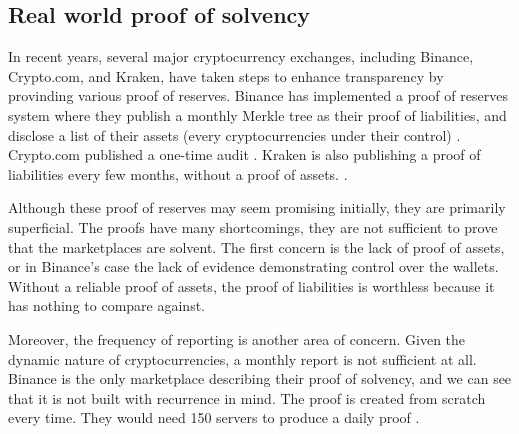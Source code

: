 \subsection{Real world proof of solvency}
In recent years, several major cryptocurrency exchanges, including Binance, Crypto.com, and Kraken, have taken steps to enhance transparency by provinding various proof of reserves.
Binance has implemented a proof of reserves system where they publish a monthly Merkle tree as their proof of liabilities, and disclose a list of their assets (every cryptocurrencies under their control) \cite{BPR}.
Crypto.com published a one-time audit \cite{CC22}.
Kraken is also publishing a proof of liabilities every few months, without a proof of assets. \cite{KK23}.

Although these proof of reserves may seem promising initially, they are primarily superficial.
The proofs have many shortcomings, they are not sufficient to prove that the marketplaces are solvent.
The first concern is the lack of proof of assets, or in Binance's case the lack of evidence demonstrating control over the wallets.
Without a reliable proof of assets, the proof of liabilities is worthless because it has nothing to compare against.

Moreover, the frequency of reporting is another area of concern. Given the dynamic nature of cryptocurrencies, a monthly report is not sufficient at all.
Binance is the only marketplace describing their proof of solvency, and we can see that it is not built with recurrence in mind.
The proof is created from scratch every time. They would need 150 servers to produce a daily proof \cite{BPS}.

















